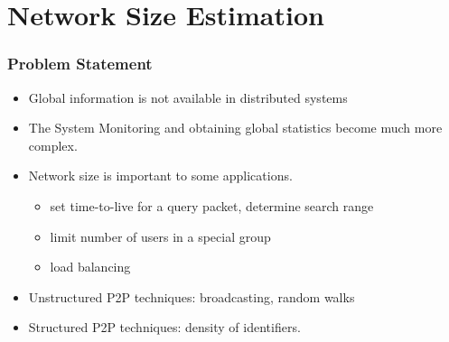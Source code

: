 \documentclass[red]{beamer}
\begin{document}
\section{Network Size Estimation}

\begin{frame}
\frametitle{Problem Statement}
\begin{itemize}
\item Global information is not available in distributed systems
\item The System Monitoring and obtaining global statistics
become much more complex.
\item Network size is important to some applications.
\begin{itemize}
\item set time-to-live for a query packet, determine search range
\item limit number of users in a special group
\item load balancing
\end{itemize}
\item Unstructured P2P techniques: broadcasting, random walks
\item Structured P2P techniques: density of identifiers.
\end{itemize}
\end{frame}

\end{document}
